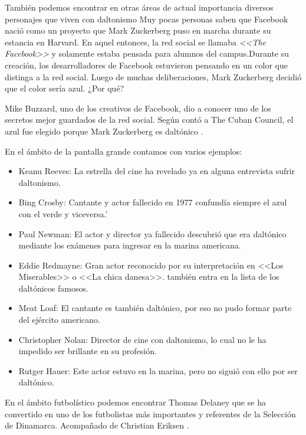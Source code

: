 \documentclass[10pt]{article}
\begin{document}
\setlength{\parskip}{2mm}

También podemos encontrar en otras áreas de actual importancia diversos personajes que viven con daltonismo 
Muy pocas personas saben que Facebook nació como un proyecto que Mark Zuckerberg puso en marcha durante su estancia en Harvard. En aquel entonces, la red social se llamaba \textit{ <<The Facebook>>} y solamente estaba pensada para alumnos del campus.Durante su creación, los desarrolladores de Facebook estuvieron pensando en un color que distinga a la red social. Luego de muchas deliberaciones, Mark Zuckerberg decidió que el color sería azul. ¿Por qué?

\setlength{\parskip}{2mm}

Mike Buzzard, uno de los creativos de Facebook, dio a conocer uno de los secretos mejor guardados de la red social. Según contó a The Cuban Council, el azul fue elegido porque Mark Zuckerberg es daltónico \cite{IEEEreferencias:Ref8}.

\setlength{\parskip}{2mm}

En el ámbito de la pantalla grande contamos con varios ejemplos: 

\setlength{\parskip}{2mm}
\begin{itemize}
    \item Keanu Reeves: La estrella del cine ha revelado ya en alguna entrevista sufrir daltonismo.
    \item Bing Crosby: Cantante y actor fallecido en 1977 confundía siempre el azul con el verde y viceversa.'
    \item Paul Newman: El actor y director ya fallecido descubrió que era daltónico mediante los exámenes para ingresar en la marina americana.
    \item Eddie Redmayne: Gran actor reconocido por su interpretación en <<Los Miserables>> o <<La chica danesa>>. también entra en la lista de los daltónicos famosos.
    \item Meat Loaf: El cantante es también daltónico, por eso no pudo formar parte del ejército americano.
    \item Christopher Nolan: Director de cine con daltonismo, lo cual no le ha impedido ser brillante en su profesión.
    \item Rutger Hauer: Este actor estuvo en la marina, pero no siguió con ello por ser daltónico\cite{IEEEreferencias:Ref9}.
\end{itemize}

En el ámbito futbolístico podemos encontrar 
Thomas Delaney que se ha convertido en uno de los futbolistas más importantes y referentes de la Selección de Dinamarca. Acompañado de Christian Eriksen \cite{IEEEreferencias:Ref10}.
\setlength{\parskip}{2mm}
\end{document}
